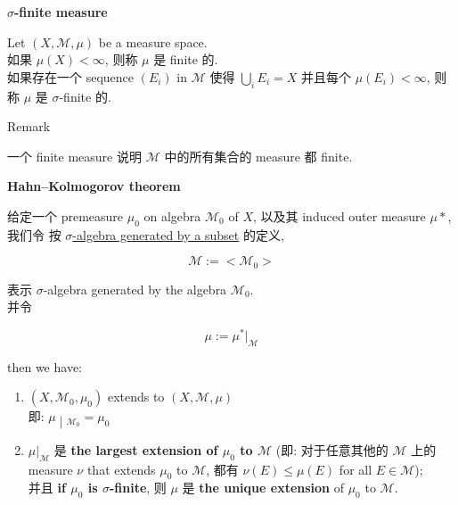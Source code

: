 \documentclass{qlnotes-export}
\begin{document}
\begin{definition}{\protect{}\label{kn-sigma-finite-measure}{\textbf{\(\sigma\)-finite
measure}}}

Let \((X,\mathcal{M},\mu)\) be a measure space.\\
如果 \(\mu(X) < \infty\), 则称 \(\mu\) 是 finite 的.\\
如果存在一个 sequence \((E_{i})\) in \(\mathcal{M}\) 使得 \(\bigcup_{i}E_{i} = X\) 并且每个 \(\mu(E_{i}) < \infty\), 则称 \(\mu\) 是 \(\sigma\)-finite 的.

\end{definition}

\begin{qlremark}{Remark}

一个 finite measure 说明 \(\mathcal{M}\) 中的所有集合的 measure 都 finite.

\end{qlremark}

\begin{theorem}{\protect{}\label{kn-hahn-kolmogorov-theorem}{\textbf{Hahn--Kolmogorov
theorem}}}

给定一个 premeasure \(\mu_{0}\) on algebra \(\mathcal{M}_{0}\) of \(X\), 以及其 induced outer measure \(\mu \ast\), 我们令 按 \href{https://qiulinfan.github.io/notes/math/measure-theory/\#kn-sigma-algebra-generated-by-a-subset}{\(\sigma\)-algebra generated by a subset} 的定义,

\[\mathcal{M} := < \mathcal{M}_{0} >\]

表示 \(\sigma\)-algebra generated by the algebra \(\mathcal{M}_{0}\).\\
并令

\[\mu := \mu^{\ast}|_{\mathcal{M}}\]

then we have:

\begin{enumerate}
\item
  \((X,\mathcal{M}_{0},\mu_{0})\) extends to \((X,\mathcal{M},\mu)\)\\
  即: \(\left. \mu \middle| {}_{\mathcal{M}_{0}} = \mu_{0} \right.\)
\item
  \(\mu|_{\mathcal{M}}\) 是 \textbf{the largest extension of \(\mu_{0}\) to \(\mathcal{M}\)} (即: 对于任意其他的 \(\mathcal{M}\) 上的 measure \(\nu\) that extends \(\mu_{0}\) to \(\mathcal{M}\), 都有 \(\nu(E) \leq \mu(E)\) for all \(E \in \mathcal{M}\));\\
  并且 \textbf{if \(\mu_{0}\) is \(\sigma\)-finite}, 则 \(\mu\) 是 \textbf{the unique extension} of \(\mu_{0}\) to \(\mathcal{M}\).
\end{enumerate}

\end{theorem}
\end{document}
